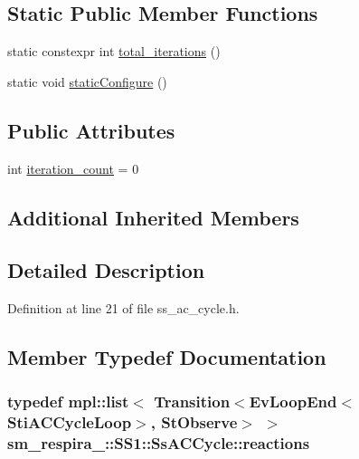 \subsection*{Static Public Member Functions}
\begin{DoxyCompactItemize}
\item 
static constexpr int \hyperlink{structsm__respira__1_1_1SS1_1_1SsACCycle_aa69a614394dc619067fc5cce34471d48}{total\+\_\+iterations} ()
\item 
static void \hyperlink{structsm__respira__1_1_1SS1_1_1SsACCycle_ab09e6e93419ceed8518f91810c14ef9e}{static\+Configure} ()
\end{DoxyCompactItemize}
\subsection*{Public Attributes}
\begin{DoxyCompactItemize}
\item 
int \hyperlink{structsm__respira__1_1_1SS1_1_1SsACCycle_a362b69f0bdd17523201cb0592b873775}{iteration\+\_\+count} = 0
\end{DoxyCompactItemize}
\subsection*{Additional Inherited Members}


\subsection{Detailed Description}


Definition at line 21 of file ss\+\_\+ac\+\_\+cycle.\+h.



\subsection{Member Typedef Documentation}
\subsubsection[{\texorpdfstring{reactions}{reactions}}]{\setlength{\rightskip}{0pt plus 5cm}typedef mpl\+::list$<$ Transition$<$Ev\+Loop\+End$<${\bf Sti\+A\+C\+Cycle\+Loop}$>$, {\bf St\+Observe}$>$ $>$ {\bf sm\+\_\+respira\+\_\+::\+S\+S1\+::\+Ss\+A\+C\+Cycle\+::reactions}}\hypertarget{structsm__respira__1_1_1SS1_1_1SsACCycle_aaf8a711a309ca6d5f385b66010b74ff0}{}\label{structsm__respira__1_1_1SS1_1_1SsACCycle_aaf8a711a309ca6d5f385b66010b74ff0}



